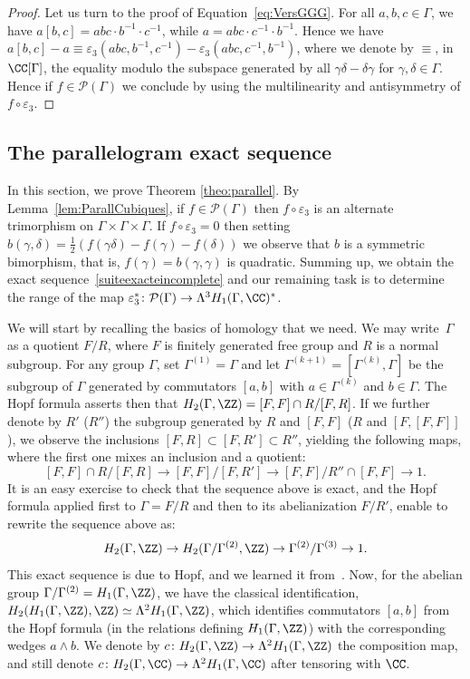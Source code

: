 \begin{proof}
Let us turn to the proof of Equation~\eqref{eq:VersGGG}.
For all $a,b,c\in\Gamma$, we have
$a[b,c]=abc\cdot b^{-1}\cdot c^{-1}$, while $a=abc\cdot c^{-1}\cdot b^{-1}$.
Hence we have
$a[b,c]-a\equiv\varepsilon_3(abc,b^{-1},c^{-1})-
\varepsilon_3(abc,c^{-1},b^{-1})$,
where we denote by $\equiv$, in $\CC[\Gamma]$, the equality modulo the
subspace generated by all $\gamma\delta-\delta\gamma$ for
$\gamma,\delta\in\Gamma$.
Hence if $f\in \mathcal{P}(\Gamma)$ we conclude by using the multilinearity
and antisymmetry of $f\circ \varepsilon_3$.
\end{proof}

\subsection{The parallelogram exact sequence}\label{ssec:suiteexacte}
In this section, we prove Theorem \ref{theo:parallel}.
By Lemma~\ref{lem:ParallCubiques},
if $f\in \mathcal{P}(\Gamma)$ then
$f\circ\varepsilon_3$ is an alternate trimorphism on
$\Gamma\times \Gamma\times \Gamma$. If $f\circ \varepsilon_3=0$ then setting
$b(\gamma,\delta)=\frac{1}{2}(f(\gamma\delta)-f(\gamma)-f(\delta))$
we observe that $b$ is a symmetric bimorphism, that is,
$f(\gamma)=b(\gamma,\gamma)$ is quadratic.
Summing up, we obtain the exact sequence~\eqref{suiteexacteincomplete} and
our remaining task is to determine the range of the map
$\varepsilon_3^*\colon
\mathcal{P}(\Gamma)\to\Lambda^3H_1(\Gamma,\CC)^*$.

We will start by recalling the basics of homology that we need.
We may write~$\Gamma$ as a quotient $F/R$, where $F$ is finitely generated
free group and $R$ is a normal subgroup.
For any group $\Gamma$, set $\Gamma^{(1)}=\Gamma$
and let $\Gamma^{(k+1)}=[\Gamma^{(k)},\Gamma]$ be the subgroup of
$\Gamma$ generated by commutators
$[a,b]$ with $a\in \Gamma^{(k)}$ and $b\in \Gamma$.
The Hopf formula asserts then that
$H_2(\Gamma,\ZZ)=[F,F]\cap R/[F,R]$. If we further denote by
$R'$ (\resp $R''$) the subgroup generated by $R$ and $[F,F]$
(\resp $R$ and $[F,[F,F]]$),
we observe the inclusions \hbox{$[F,R]\subset[F,R']\subset R''$}, yielding the
following maps, where the first one mixes an inclusion and a quotient:
\[ [F,F]\cap R/[F,R]\to [F,F]/[F,R'] \to [F,F]/R''\cap[F,F]\to 1. \]
It is an easy exercise to check that the sequence above is exact, and
the Hopf formula applied first to $\Gamma=F/R$ and then to its
abelianization $F/R'$, enable to rewrite the sequence above as:
\begin{equation}\label{eq:Stallings}
H_2(\Gamma,\ZZ)\to H_2(\Gamma/\Gamma^{(2)},\ZZ)\to \Gamma^{(2)}/\Gamma^{(3)}
\to 1.
\end{equation}
This exact sequence is due to Hopf, and we learned it from~\cite{Stallings}.
Now, for the abelian group $\Gamma/\Gamma^{(2)}=H_1(\Gamma,\ZZ)$, we
have the classical identification,
$H_2(H_1(\Gamma,\ZZ),\ZZ)\simeq\Lambda^2 H_1(\Gamma,\ZZ)$, which
identifies commutators $[a,b]$ from the Hopf formula (in the relations
defining $H_1(\Gamma,\ZZ)$) with the corresponding wedges $a\wedge b$.
We denote by $c\colon H_2(\Gamma,\ZZ)\to\Lambda^2H_1(\Gamma,\ZZ)$ the
composition map, and still denote
$c\colon H_2(\Gamma,\CC)\to\Lambda^2H_1(\Gamma,\CC)$ after tensoring with $\CC$.

